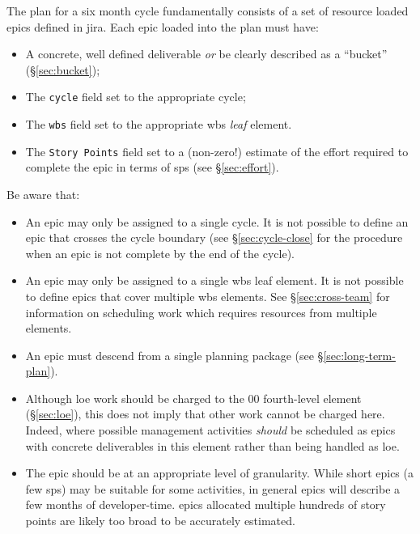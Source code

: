 The plan for a six month \gls{cycle} fundamentally consists of a set of resource loaded \glspl{epic} defined in \gls{jira}.
Each \gls{epic} loaded into the plan must have:

\begin{itemize}
\item
  A concrete, well defined deliverable \emph{or} be clearly described as a ``bucket'' (\S\ref{sec:bucket});
\item
  The \texttt{cycle} field set to the appropriate \gls{cycle};
\item
  The \texttt{wbs} field set to the appropriate \gls{wbs} \emph{leaf} \gls{element}.
\item
  The \texttt{Story Points} field set to a (non-zero!) estimate of the effort required to complete the \gls{epic} in terms of \glspl{sp} (see \S\ref{sec:effort}).
\end{itemize}

Be aware that:

\begin{itemize}
\item
  An \gls{epic} may only be assigned to a single \gls{cycle}.
  It is not possible to define an \gls{epic} that crosses the \gls{cycle} boundary (see \S\ref{sec:cycle-close} for the procedure when an \gls{epic} is not complete by the end of the \gls{cycle}).
\item
  An \gls{epic} may only be assigned to a single \gls{wbs} leaf \gls{element}.
  It is not possible to define \glspl{epic} that cover multiple \gls{wbs} \glspl{element}.
  See \S\ref{sec:cross-team} for information on scheduling work which requires resources from multiple \glspl{element}.
\item
  An \gls{epic} must descend from a single planning package (see \S\ref{sec:long-term-plan}).
\item
  Although \gls{loe} work should be charged to the 00 fourth-level \gls{element} (\S\ref{sec:loe}), this does not imply that other work cannot be charged here.
  Indeed, where possible management activities \emph{should} be scheduled as \glspl{epic} with concrete deliverables in this \gls{element} rather than being handled as \gls{loe}.
\item
  The \gls{epic} should be at an appropriate level of granularity.
  While short \glspl{epic} (a few \glspl{sp}) may be suitable for some activities, in general \glspl{epic} will describe a few months of developer-time.
  \Glspl{epic} allocated multiple hundreds of \gls{story} points are likely too broad to be accurately estimated.
\end{itemize}

